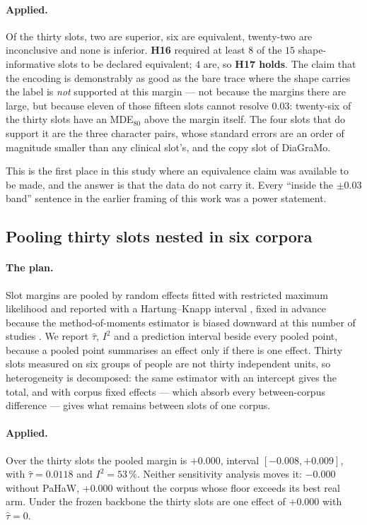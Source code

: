 \paragraph{Applied.} Of the thirty slots, two are superior, six are equivalent, twenty-two are
inconclusive and none is inferior. \textbf{H16} required at least $8$ of the $15$
shape-informative slots to be declared equivalent; $4$ are, so \textbf{H17 holds}. The claim that
the encoding is demonstrably as good as the bare trace where the shape carries the label is
\emph{not} supported at this margin --- not because the margins there are large, but because eleven
of those fifteen slots cannot resolve $0.03$: twenty-six of the thirty slots have an
MDE$_{80}$ above the margin itself. The four slots that do support it are the three character
pairs, whose standard errors are an order of magnitude smaller than any clinical slot's, and the
copy slot of DiaGraMo.

This is the first place in this study where an equivalence claim was available to be made, and the
answer is that the data do not carry it. Every ``inside the $\pm 0.03$ band'' sentence in the
earlier framing of this work was a power statement.

\subsection{Pooling thirty slots nested in six corpora}
\label{sec:stats-pooling}

\paragraph{The plan.} Slot margins are pooled by random effects fitted with restricted maximum
likelihood and reported with a Hartung--Knapp interval \citep{hartung2001}, fixed in advance because
the method-of-moments estimator is biased downward at this number of studies
\citep{viechtbauer2005}. We report $\hat\tau$, $I^2$ \citep{higgins2002} and a prediction interval
beside every pooled point, because a pooled point summarises an effect only if there is one effect.
Thirty slots measured on six groups of people are not thirty independent units, so heterogeneity is
decomposed: the same estimator with an intercept gives the total, and with corpus fixed effects ---
which absorb every between-corpus difference --- gives what remains between slots of one corpus.

\paragraph{Applied.} Over the thirty slots the pooled margin is $+0.000$, interval
$[-0.008, +0.009]$, with $\hat\tau = 0.0118$ and $I^2 = 53\,\%$. Neither sensitivity analysis moves
it: $-0.000$ without PaHaW, $+0.000$ without the corpus whose floor exceeds its best real arm.
Under the frozen backbone the thirty slots are one effect of $+0.000$ with $\hat\tau = 0$.

